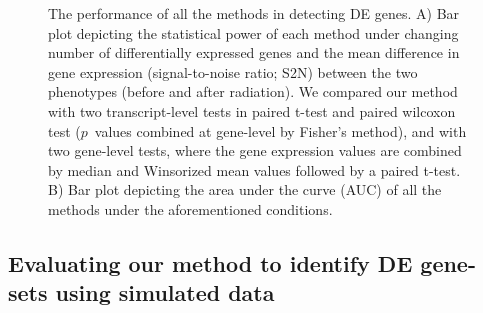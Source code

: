 \documentclass[hidelinks,11pt]{article}
\begin{document}
\begin{figure}[!ht]
\hfill
{}
\hfill
{}
\hfill
\caption{The performance of all the methods in detecting DE genes. A) Bar plot depicting the statistical power of each method under changing number of differentially expressed genes and the mean difference in gene expression (signal-to-noise ratio; S2N) between the two phenotypes (before and after radiation). We compared our method with two transcript-level tests in paired t-test and paired wilcoxon test ($p$~values combined at gene-level by Fisher's method), and with two gene-level tests, where the gene expression values are combined by median and Winsorized mean values followed by a paired t-test. B) Bar plot depicting the area under the curve (AUC) of all the methods under the aforementioned conditions.}
\end{figure}

\subsection*{Evaluating our method to identify DE gene-sets using simulated data}
\end{document}
